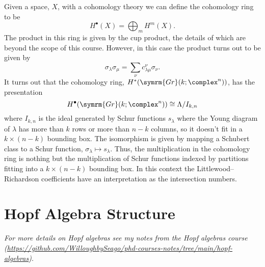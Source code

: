 \documentclass[fleqn]{NotesClass}
\newcommand{\isomorphic}{\cong}
\newcommand{\Gr}{\symrm{Gr}}
\begin{document}
    Given a space, \(X\), with a cohomology theory we can define the cohomology ring to be
    \begin{equation}
        H^{\bullet}(X) = \bigoplus_m H^m(X).
    \end{equation}
    The product in this ring is given by the cup product, the details of which are beyond the scope of this course.
    However, in this case the product turns out to be given by
    \begin{equation}
        \sigma_\lambda \sigma_\mu = \sum_\nu c^{\nu}_{\lambda\mu} \sigma_\nu.
    \end{equation}
    It turns out that the cohomology ring, \(H^*(\Gr(k; \complex^n))\), has the presentation
    \begin{equation}
        H^{\bullet}(\Gr(k; \complex^n)) \isomorphic \Lambda / I_{k,n}
    \end{equation}
    where \(I_{k,n}\) is the ideal generated by Schur functions \(s_\lambda\) where the Young diagram of \(\lambda\) has more than \(k\) rows or more than \(n - k\) columns, so it doesn't fit in a \(k \times (n - k)\) bounding box.
    The isomorphism is given by mapping a Schubert class to a Schur function, \(\sigma_\lambda \mapsto s_\lambda\).
    Thus, the multiplication in the cohomology ring is nothing but the multiplication of Schur functions indexed by partitions fitting into a \(k \times (n - k)\) bounding box.
    In this context the Littlewood--Richardson coefficients have an interpretation as the intersection numbers.
    
    \section{Hopf Algebra Structure}
    \textit{For more details on Hopf algebras see my notes from the Hopf algebras course (\url{https://github.com/WilloughbySeago/phd-courses-notes/tree/main/hopf-algebras}).}
    
\end{document}

